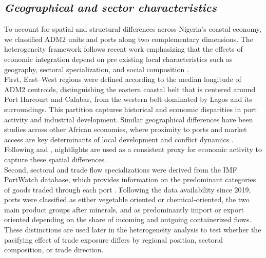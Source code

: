 \subsection{\textit{Geographical and sector characteristics}} 
To account for spatial and structural differences across Nigeria’s coastal economy, we classified ADM2 units and ports along two complementary dimensions. The heterogeneity framework follows recent work emphasizing that the effects of economic integration depend on pre existing local characteristics such as geography, sectoral specialization, and social composition \parencite{berman2015external, mcguirk2020economic}.\\
First, East–West regions were defined according to the median longitude of ADM2 centroids, distinguishing the eastern coastal belt that is centered around Port Harcourt and Calabar, from the western belt dominated by Lagos and its surroundings. This partition captures historical and economic disparities in port activity and industrial development. Similar geographical differences have been studies across other African economies, where proximity to ports and market access are key determinants of local development and conflict dynamics \parencite{storeygard2016farther, michalopoulos2018spatial}.
Following \textcite{henderson2012measuring} and \textcite{amodio2024trade}, nightlights are used as a consistent proxy for economic activity to capture these spatial differences.\\

Second, sectoral and trade flow specializations were derived from the IMF PortWatch database, which provides information on the predominant categories of goods traded through each port \parencite{imfportwatch2025}. Following the data availability since 2019, ports were classified as either vegetable oriented or chemical-oriented, the two main product groups after minerals, and as predominantly import or export oriented depending on the share of incoming and outgoing containerized flows. These distinctions are used later in the heterogeneity analysis to test whether the pacifying effect of trade exposure differs by regional position, sectoral composition, or trade direction. \\

